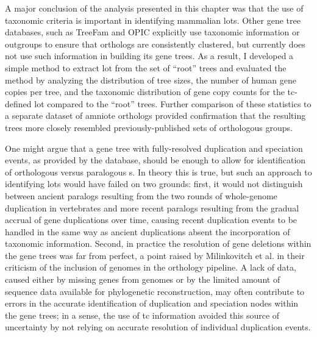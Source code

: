 A major conclusion of the analysis presented in this chapter was that
the use of taxonomic criteria is important in identifying mammalian
\acp{lot}. Other gene tree databases, such as TreeFam
\citep{Ruan2008} and OPIC \citep{Heger2008} explicitly use taxonomic
information or outgroups to ensure that orthologs are consistently
clustered, but \cmp currently does not use such information in
building its gene trees. As a result, I developed a simple method to
extract \ac{lot} from the set of ``root'' \cmp trees and evaluated the
method by analyzing the distribution of tree sizes, the number of
human gene copies per tree, and the taxonomic distribution of gene
copy counts for the \ac{tc}-defined \ac{lot} compared to the ``root''
\cmp trees. Further comparison of these statistics to a separate
dataset of amniote orthologs provided confirmation that the resulting
trees more closely resembled previously-published sets of orthologous
groups.

One might argue that a gene tree with fully-resolved duplication and
speciation events, as provided by the \cmp database, should be enough
to allow for identification of orthologous versus paralogous
\subtr{}s. In theory this is true, but such an approach to identifying
\acp{lot} would have failed on two grounds: first, it would not
distinguish between ancient paralogs resulting from the two rounds of
whole-genome duplication in vertebrates and more recent paralogs
resulting from the gradual accrual of gene duplications over time,
causing recent duplication events to be handled in the same way as
ancient duplications absent the incorporation of taxonomic
information. Second, in practice the resolution of gene deletions
within the \cmp gene trees was far from perfect, a point raised by
Milinkovitch et al. \citeyearpar{Milinkovitch2010} in their criticism
of the inclusion of \lcv genomes in the \ens \cmp orthology
pipeline. A lack of data, caused either by missing genes from \lcv
genomes or by the limited amount of sequence data available for
phylogenetic reconstruction, may often contribute to errors in the
accurate identification of duplication and speciation nodes within the
\cmp gene trees; in a sense, the use of \ac{tc} information avoided
this source of uncertainty by not relying on accurate resolution of
individual duplication events.
